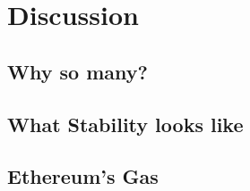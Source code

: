

\section{Discussion}

\subsection{Why so many?}


\subsection{What Stability looks like}\label{sec:stability}

\subsection{Ethereum's Gas}\label{sec:GasInvs}

